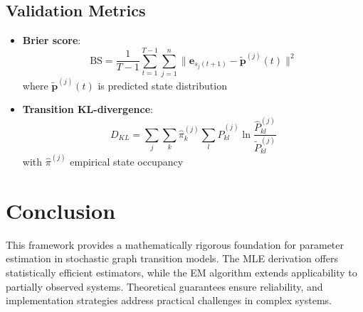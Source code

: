 \documentclass[answers,12pt,addpoints]{exam}
\begin{document}
\subsection{Validation Metrics}
\begin{itemize}
    \item \textbf{Brier score}:
    \begin{equation}
        \text{BS} = \frac{1}{T-1} \sum_{t=1}^{T-1} \sum_{j=1}^{n} \| \mathbf{e}_{s_j(t+1)} - \widetilde{\mathbf{p}}^{(j)}(t) \|^2
    \end{equation}
    where $\widetilde{\mathbf{p}}^{(j)}(t)$ is predicted state distribution
    
    \item \textbf{Transition KL-divergence}:
    \begin{equation}
        D_{KL} = \sum_{j} \sum_{k} \hat{\pi}^{(j)}_k \sum_{l} \hat{P}^{(j)}_{kl} \ln \frac{\hat{P}^{(j)}_{kl}}{\widetilde{P}^{(j)}_{kl}}
    \end{equation}
    with $\hat{\pi}^{(j)}$ empirical state occupancy
\end{itemize}

\section{Conclusion}
This framework provides a mathematically rigorous foundation for parameter estimation in stochastic graph transition models. The MLE derivation offers statistically efficient estimators, while the EM algorithm extends applicability to partially observed systems. Theoretical guarantees ensure reliability, and implementation strategies address practical challenges in complex systems.

\newpage
\end{document}
